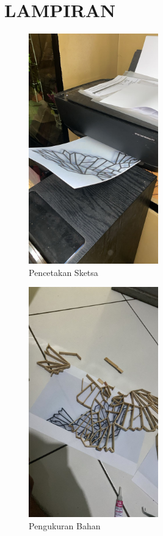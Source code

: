 \documentclass[a4paper,12pt]{article}
\begin{document}
    \section*{LAMPIRAN}
    \begin{figure}[ht]
      \begin{center}
        \includegraphics[width=0.50\textwidth]{images/gambar1.jpeg}
      \end{center}
      \caption{Pencetakan Sketsa}\label{fig:}
    \end{figure}
   \begin{figure}
    \begin{center}
      \includegraphics[width=0.50\textwidth]{images/gambar2.jpeg}
    \end{center}
    \caption{Pengukuran Bahan}\label{fig:}
   \end{figure}
\end{document}
